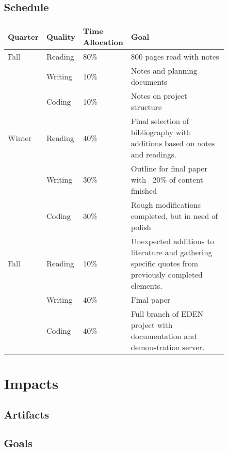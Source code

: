 \documentclass[a4paper,man,natbib]{apa6}
\begin{document}
   \subsection{Schedule}
   \begin{center}
   \begin{tabular}{|l|p{0.1\linewidth}|p{0.1\linewidth}|p{0.7\linewidth}|}
   \hline
   Quarter & Quality & Time Allocation & Goal                         \\ \hline
   Fall    & Reading & 80\%            & 800 pages read with notes    \\ \cline{2-4} 
           & Writing & 10\%            & Notes and planning documents \\ \cline{2-4} 
           & Coding  & 10\%            & Notes on project structure   \\ \hline 
   Winter  & Reading & 40\%            & Final selection of bibliography with additions based on notes and readings.   \\ \cline{2-4} 
           & Writing & 30\%            & Outline for final paper with ~20\% of content finished \\ \cline{2-4} 
           & Coding  & 30\%            & Rough modifications completed, but in need of polish  \\ \hline
   Fall    & Reading & 10\%            & Unexpected additions to literature and gathering specific quotes from previously completed elements.   \\ \cline{2-4} 
           & Writing & 40\%            & Final paper \\ \cline{2-4}
           & Coding  & 40\%            & Full branch of EDEN project with documentation and demonstration server. \\ \hline
   \end{tabular}
   \end{center}
   \section*{Impacts}
   \subsection*{Artifacts}
   \subsection*{Goals}
\end{document}
